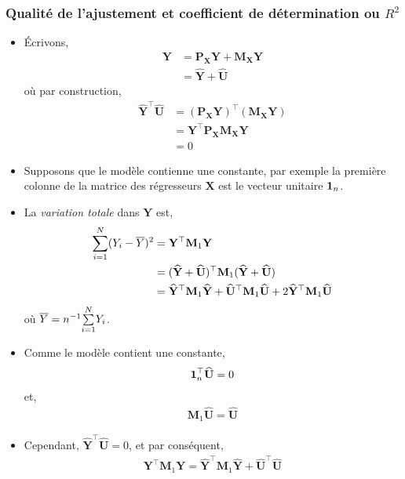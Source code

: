 \begin{frame}[allowframebreaks]\frametitle{Qualité de l'ajustement et coefficient de détermination ou $R^2$}
\begin{itemize}
\item \'Ecrivons,
\begin{align*}
\mathbf{Y} &= \mathbf{P}_\mathbf{X}\mathbf{Y}+ \mathbf{M}_\mathbf{X}\mathbf{Y}\\
&=\widehat{\mathbf{Y}}+\widehat{\mathbf{U}}
\end{align*}
où par construction,
\begin{align*}
\widehat{\mathbf{Y}}^\top\widehat{\mathbf{U}} &= (\mathbf{P}_\mathbf{X}\mathbf{Y})^\top (\mathbf{M}_\mathbf{X}\mathbf{Y})\\ 
&= \mathbf{Y}^\top  \mathbf{P}_\mathbf{X} \mathbf{M}_\mathbf{X}\mathbf{Y}\\
& = 0
\end{align*}
\item Supposons que le modèle contienne une constante, par exemple la première colonne de la matrice des régresseurs $\mathbf{X}$ est le vecteur unitaire $\mathbf{1}_n$.
\item  La \emph{variation totale} dans $\mathbf{Y}$ est,
\begin{align*}
\underset{i=1}{\overset{N}{\sum}}(Y_i - \overline{Y})^2 &= \mathbf{Y}^\top\mathbf{M}_1\mathbf{Y}\\
&=(\widehat{\mathbf{Y}}  + \widehat{\mathbf{U}} )^\top\mathbf{M}_1(\widehat{\mathbf{Y}}  + \widehat{\mathbf{U}} )\\
&=\widehat{\mathbf{Y}}^\top\mathbf{M}_1\widehat{\mathbf{Y}} + \widehat{\mathbf{U}}^\top\mathbf{M}_1\widehat{\mathbf{U}} + 2\widehat{\mathbf{Y}}^\top\mathbf{M}_1\widehat{\mathbf{U}}
\end{align*}
où $\overline{Y} = n^{-1}\underset{i=1}{\overset{N}{\sum}} Y_i$.
\item  Comme le modèle contient une constante,
\begin{align*}
\mathbf{1}_n^\top\widehat{\mathbf{U}} = 0
\end{align*}
et,
\begin{align*}
\mathbf{M}_1\widehat{\mathbf{U}} =\widehat{\mathbf{U}}  
\end{align*}
\item Cependant, $\widehat{\mathbf{Y}}^\top \widehat{\mathbf{U}} =0$, et par conséquent,
\begin{align*}
\mathbf{Y}^\top\mathbf{M}_1\mathbf{Y} = \widehat{\mathbf{Y}}^\top\mathbf{M}_1\widehat{\mathbf{Y}} +
\widehat{\mathbf{U}}^\top\widehat{\mathbf{U}} 
\end{align*}

\end{itemize}
\end{frame}
